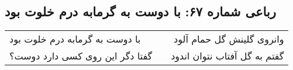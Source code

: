 \begin{center}
\section*{رباعی شماره ۶۷: با دوست به گرمابه درم خلوت بود}
\label{sec:067}
\begin{longtable}{l p{0.5cm} r}
با دوست به گرمابه درم خلوت بود
&&
وانروی گلینش گل حمام آلود
\\
گفتا دگر این روی کسی دارد دوست؟
&&
گفتم به گل آفتاب نتوان اندود
\\
\end{longtable}
\end{center}
